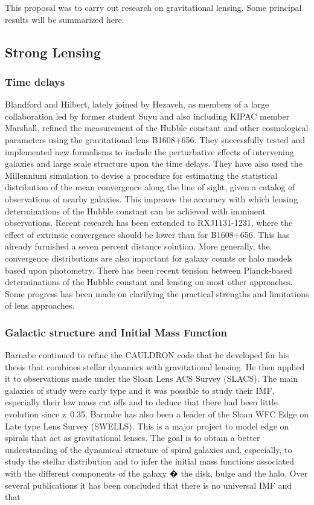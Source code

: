 \documentclass[psfig,11pt]{article}
\begin{document}
This proposal was to carry out research on gravitational lensing. Some principal results will be summarized here.
\subsection{Strong Lensing}
\subsubsection{Time delays}
Blandford and Hilbert, lately joined by Hezaveh, as members of a large collaboration led by former student Suyu and also including KIPAC member Marshall, refined  the measurement of the Hubble constant and other cosmological parameters using the gravitational lens B1608+656. They successfully tested and implemented new formalisms to include the perturbative effects of intervening galaxies and large scale structure upon the time delays.  They have also used the Millennium simulation to devise a procedure for estimating the statistical distribution of the mean convergence along the line of sight, given a catalog of observations of nearby galaxies. This improves the accuracy with which lensing determinations of the Hubble constant can be achieved with imminent observations. Recent research has been extended to RXJ1131-1231, where the effect of extrinsic convergence should be lower than for B1608+656. This has already furnished a seven percent distance solution. More generally, the convergence distributions are also important for galaxy counts or halo models based upon photometry. There has been recent tension between Planck-based determinations of the Hubble constant and lensing on most other approaches. Some progress has been made on clarifying the practical strengths and limitations of lens approaches.
\subsubsection{Galactic structure and Initial Mass Function}
Barnabe continued to refine the CAULDRON code that he developed for his thesis that combines stellar dynamics with gravitational lensing. He then applied it to observations made under the Sloan Lens ACS Survey (SLACS). The main galaxies of study were early type and it was possible to study their IMF, especially their low mass cut offs and to deduce that there had been little evolution since z~0.35. Barnabe has also been a leader of the Sloan WFC Edge on Late type Lens Survey  (SWELLS). This is a major project to model edge on spirals that act as gravitational lenses.  The goal is to obtain a better understanding of the dynamical structure of spiral galaxies and, especially, to study the stellar distribution and to infer the  initial mass functions associated with the different components of the galaxy � the disk, bulge and the halo. Over several publications it has been concluded that there is no universal IMF and that
\end{document}
